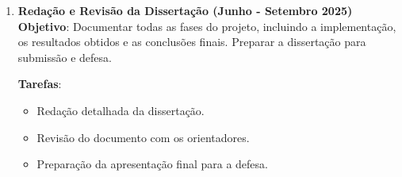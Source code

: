 \begin{enumerate}
    \item \textbf{Redação e Revisão da Dissertação (Junho - Setembro 2025)} \\
    \textbf{Objetivo}: Documentar todas as fases do projeto, incluindo a implementação, os resultados obtidos e as conclusões finais. Preparar a dissertação para submissão e defesa.
    
    \textbf{Tarefas}:
    \begin{itemize}
        \item Redação detalhada da dissertação.
        \item Revisão do documento com os orientadores.
        \item Preparação da apresentação final para a defesa.
    \end{itemize}
\end{enumerate}

